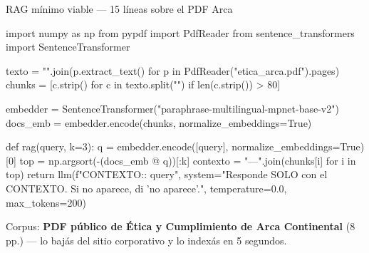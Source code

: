 \documentclass[aspectratio=169, 11pt]{beamer}
\begin{document}
\begin{frame}{RAG mínimo viable --- 15 líneas sobre el PDF Arca}
  \begin{pyblock}
import numpy as np
from pypdf import PdfReader
from sentence_transformers import SentenceTransformer

texto = "\n".join(p.extract_text() for p in PdfReader("etica_arca.pdf").pages)
chunks = [c.strip() for c in texto.split("\n\n") if len(c.strip()) > 80]

embedder = SentenceTransformer("paraphrase-multilingual-mpnet-base-v2")
docs_emb = embedder.encode(chunks, normalize_embeddings=True)

def rag(query, k=3):
    q = embedder.encode([query], normalize_embeddings=True)[0]
    top = np.argsort(-(docs_emb @ q))[:k]
    contexto = "\n---\n".join(chunks[i] for i in top)
    return llm(f"CONTEXTO:\n\nPREGUNTA: {query}",
               system="Responde SOLO con el CONTEXTO. Si no aparece, di 'no aparece'.",
               temperature=0.0, max_tokens=200)
  \end{pyblock}
  \vspace{2pt}
  {\footnotesize\color{arcaDark}
  Corpus: \textbf{PDF público de Ética y Cumplimiento de Arca Continental} (8 pp.) ---
  lo bajás del sitio corporativo y lo indexás en 5 segundos.}
\end{frame}
\end{document}
